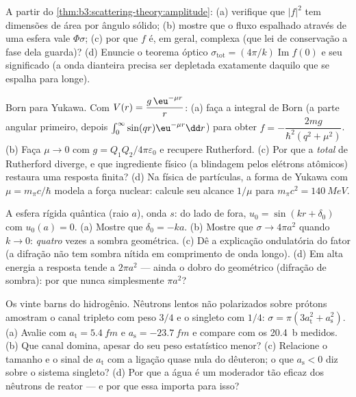\begin{exercise}[$\star$]\label{exo:b3:scattering-theory:4}
A partir do \cref{thm:b3:scattering-theory:amplitude}: (a) verifique
que $|f|^2$ tem dimensões de área por ângulo sólido; (b) mostre que o
fluxo espalhado através de uma esfera vale $\Phi\sigma$; (c) por que
$f$ é, em geral, complexa (que lei de conservação a fase dela guarda)?
(d) Enuncie o teorema óptico $\sigma_{\text{tot}} =
(4\pi/k)\operatorname{Im}f(0)$ e seu significado (a onda dianteira
precisa ser depletada exatamente daquilo que se espalha para longe).
\end{exercise}

\begin{exercise}[$\star\star$]\label{exo:b3:scattering-theory:5}
Born para Yukawa. Com $V(r) = \dfrac{g\,\eu^{-\mu r}}{r}$: (a) faça a
integral de Born (a parte angular primeiro, depois $\int_0^
\infty\sin(qr)\eu^{-\mu r}\dd r$) para obter $f = -\dfrac{2mg}
{\hbar^2(q^2 + \mu^2)}$. (b) Faça $\mu \to 0$ com $g =
Q_1Q_2/4\pi\varepsilon_0$ e recupere Rutherford. (c) Por que a  \emph{total} de Rutherford diverge, e que ingrediente físico (a
blindagem pelos elétrons atômicos) restaura uma resposta finita? (d) Na
física de partículas, a forma de Yukawa com $\mu =
m_\pi c/\hbar$ modela a força nuclear: calcule seu alcance $1/\mu$ para
$m_\pi c^2 = \qty{140}{MeV}$.
\end{exercise}

\begin{exercise}[$\star\star$]\label{exo:b3:scattering-theory:6}
A esfera rígida quântica (raio $a$), onda $s$: do lado de fora, $u_0 =
\sin(kr + \delta_0)$ com $u_0(a) = 0$. (a) Mostre que
$\delta_0 = -ka$. (b) Mostre que $\sigma \to 4\pi a^2$ quando $k \to 0$:
\emph{quatro} vezes a sombra geométrica. (c) Dê a explicação ondulatória
do fator (a difração não tem sombra nítida em comprimento de onda
longo). (d) Em alta energia a resposta tende a $2\pi a^2$ --- ainda o
dobro do geométrico (difração de sombra): por que nunca simplesmente
$\pi a^2$?
\end{exercise}

\begin{exercise}[$\star\star$]\label{exo:b3:scattering-theory:7}
Os vinte barns do hidrogênio. Nêutrons lentos não polarizados sobre
prótons amostram o canal tripleto com peso $3/4$ e o singleto com
$1/4$: $\sigma = \pi(3a_{\text{t}}^2 +
a_{\text{s}}^2)$. (a) Avalie com $a_{\text{t}} = \qty{5.4}{fm}$ e
$a_{\text{s}} = \qty{-23.7}{fm}$ e compare com os \qty{20.4}{b}
medidos. (b) Que canal domina, apesar do seu peso estatístico menor?
(c) Relacione o tamanho e o sinal de $a_{\text{t}}$ com a ligação quase
nula do dêuteron; o que $a_{\text{s}} < 0$ diz sobre o sistema
singleto? (d) Por que a água é um moderador tão eficaz dos nêutrons de
reator --- e por que essa  importa para isso?
\end{exercise}

